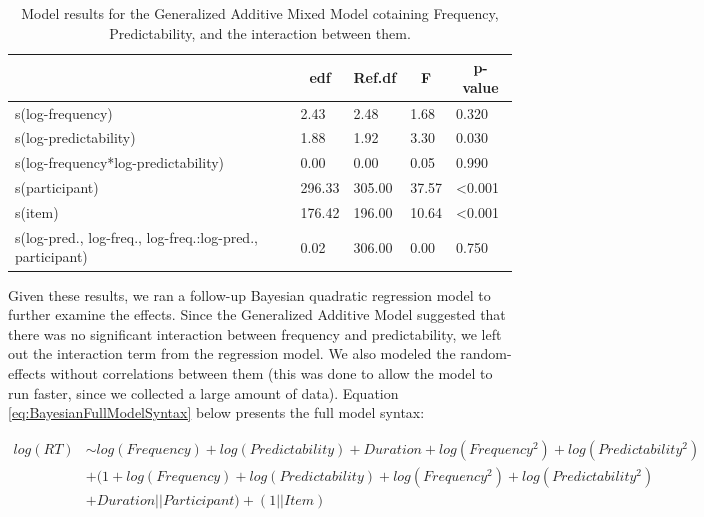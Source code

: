 \documentclass[
  man,floatsintext]{apa6}
\begin{document}
\begin{table}[H]

\begin{center}
\begin{threeparttable}

\caption{\label{tab:gamModelInterTab}Model results for the Generalized Additive Mixed Model cotaining Frequency, Predictability, and the interaction between them.}

\begin{tabular}{lllll}
\toprule
 & \multicolumn{1}{c}{edf} & \multicolumn{1}{c}{Ref.df} & \multicolumn{1}{c}{F} & \multicolumn{1}{c}{p-value}\\
\midrule
s(log-frequency) & 2.43 & 2.48 & 1.68 & 0.320\\
s(log-predictability) & 1.88 & 1.92 & 3.30 & 0.030\\
s(log-frequency*log-predictability) & 0.00 & 0.00 & 0.05 & 0.990\\
s(participant) & 296.33 & 305.00 & 37.57 & <0.001\\
s(item) & 176.42 & 196.00 & 10.64 & <0.001\\
s(log-pred., log-freq., log-freq.:log-pred., participant) & 0.02 & 306.00 & 0.00 & 0.750\\
\bottomrule
\end{tabular}

\end{threeparttable}
\end{center}

\end{table}

Given these results, we ran a follow-up Bayesian quadratic regression model to further examine the effects. Since the Generalized Additive Model suggested that there was no significant interaction between frequency and predictability, we left out the interaction term from the regression model. We also modeled the random-effects without correlations between them (this was done to allow the model to run faster, since we collected a large amount of data). Equation \eqref{eq:BayesianFullModelSyntax} below presents the full model syntax:

\begin{equation}
\begin{aligned}
\label{eq:BayesianFullModelSyntax}
log(RT) & \sim  log(Frequency) + log(Predictability) + Duration + log(Frequency^2)  
+ log(Predictability^2) \\ 
& + (1 + log(Frequency) + log(Predictability) + log(Frequency^2) + log(Predictability^2) \\
& + Duration || Participant) + (1 || Item)
\end{aligned}
\end{equation}
\end{document}
